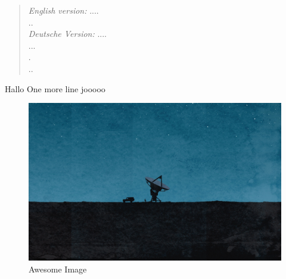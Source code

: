\documentclass[11pt,a4paper,oneside]{report}
\begin{document}
\begin{abstract}
\noindent\emph{English version:}\newline\newline
\noindent
....\\
..\\

\vspace{1cm}
\noindent\emph{Deutsche Version:}\newline\newline
\noindent
....\\
...\\
.\\
..\\

\end{abstract}

\tableofcontents

\listoffigures

\listoftables


Hallo %
One more line %
jooooo \cite{Senn2009}

\begin{figure}[h] %
    \centering
    \includegraphics[width=1.0\textwidth]{./images/image.jpg}
    \caption{Awesome Image}
    \label{fig:awesome_image}
\end{figure}
\end{document}
